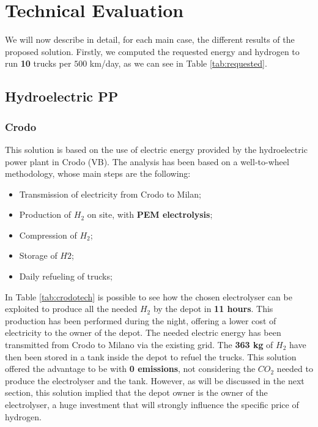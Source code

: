 \chapter{Technical Evaluation}
We will now describe in detail, for each main case, the different results of the proposed solution. Firstly, we computed the requested energy and hydrogen to run \textbf{10 }trucks per $500$ km/day, as we can see in Table \ref{tab:requested}.



\section{Hydroelectric PP}
\subsection{Crodo}
This solution is based on the use of electric energy provided by the hydroelectric power plant in Crodo (VB). The analysis has been based on a well-to-wheel methodology, whose main steps are the following:

\begin{itemize}
	\item Transmission of electricity from Crodo to Milan;
    \item Production of $H_2$ on site, with \textbf{PEM electrolysis};
    \item Compression of $H_2$;
    \item Storage of $H2$;
    \item Daily refueling of trucks;
\end{itemize}



In Table \ref{tab:crodotech} is possible to see how the chosen electrolyser can be exploited to produce all the needed $H_2$ by the depot in \textbf{11 hours}. This production has been performed during the night, offering a lower cost of electricity to the owner of the depot. The needed electric energy has been transmitted from Crodo to Milano via the existing grid. The \textbf{363 kg} of $H_2$ have then been stored in a tank inside the depot to refuel the trucks. This solution offered the advantage to be with \textbf{0 emissions}, not considering the $CO_2$ needed to produce the electrolyser and the tank. However, as will be discussed in the next section, this solution implied that the depot owner is the owner of the electrolyser, a huge investment that will strongly influence the specific price of hydrogen.

